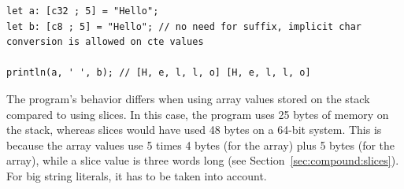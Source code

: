 \begin{lstlisting}[style=coloredverbatim]
let a: [c32 ; 5] = "Hello";
let b: [c8 ; 5] = "Hello"; // no need for suffix, implicit char conversion is allowed on cte values

println(a, ' ', b); // [H, e, l, l, o] [H, e, l, l, o]
\end{lstlisting}

The program's behavior differs when using array values stored on the stack
compared to using slices. In this case, the program uses 25 bytes of memory on
the stack, whereas slices would have used 48 bytes on a 64-bit system. This is
because the array values use 5 times 4 bytes (for the  array) plus 5
bytes (for the  array), while a slice value is three words long (see
Section~\ref{sec:compound:slices}). For big string literals, it has to be taken into
account.

\vfill%
\pagebreak
